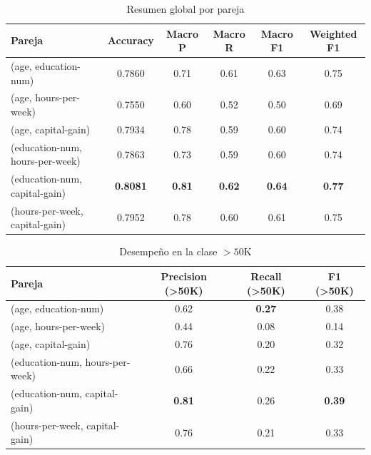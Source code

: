 \documentclass[12pt,a4paper]{article}
\begin{document}
\begin{enumerate}
\begin{itemize}
      \begin{table}[H]
        \centering
        \small
        \begin{tabular}{lccccc}
          \toprule
          \textbf{Pareja} & \textbf{Accuracy} & \textbf{Macro P} & \textbf{Macro R} & \textbf{Macro F1} & \textbf{Weighted F1} \\
          \midrule
          (age, education-num)           & 0.7860 & 0.71 & 0.61 & 0.63 & 0.75 \\
          (age, hours-per-week)          & 0.7550 & 0.60 & 0.52 & 0.50 & 0.69 \\
          (age, capital-gain)            & 0.7934 & 0.78 & 0.59 & 0.60 & 0.74 \\
          (education-num, hours-per-week)& 0.7863 & 0.73 & 0.59 & 0.60 & 0.74 \\
          (education-num, capital-gain)  & \textbf{0.8081} & \textbf{0.81} & \textbf{0.62} & \textbf{0.64} & \textbf{0.77} \\
          (hours-per-week, capital-gain) & 0.7952 & 0.78 & 0.60 & 0.61 & 0.75 \\
          \bottomrule
        \end{tabular}
        \caption{Resumen global por pareja}
        \label{tab:resumen_global_parejas}
      \end{table}

      \begin{table}[H]
        \centering
        \small
        \begin{tabular}{lccc}
          \toprule
          \textbf{Pareja} & \textbf{Precision (>50K)} & \textbf{Recall (>50K)} & \textbf{F1 (>50K)} \\
          \midrule
          (age, education-num)            & 0.62 & \textbf{0.27} & 0.38 \\
          (age, hours-per-week)           & 0.44 & 0.08          & 0.14 \\
          (age, capital-gain)             & 0.76 & 0.20          & 0.32 \\
          (education-num, hours-per-week) & 0.66 & 0.22          & 0.33 \\
          (education-num, capital-gain)   & \textbf{0.81} & 0.26 & \textbf{0.39} \\
          (hours-per-week, capital-gain)  & 0.76 & 0.21          & 0.33 \\
          \bottomrule
        \end{tabular}
        \caption{Desempeño en la clase $>50$K}
        \label{tab:minoritaria_parejas}
      \end{table}


\end{itemize}
\end{enumerate}
\end{document}
